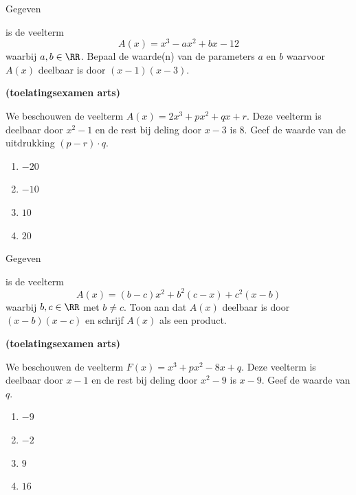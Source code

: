 \documentclass{ximera}
\begin{document}
\begin{Oefening}\setcounter{enumi}{10}
\hypertarget{oef3.10}{Gegeven} is de veelterm
\[
A(x) = x^3 - ax^2 + bx - 12
\]
waarbij $a,b \in \RR$. Bepaal de waarde(n) van de parameters $a$ en $b$ waarvoor $A(x)$ deelbaar is door $(x-1)(x-3)$. 
\end{Oefening}

\begin{Oefening}\setcounter{enumi}{11} 
\hypertarget{oef3.11}{{\bf (toelatingsexamen arts)}}
We beschouwen de veelterm $A(x) = 2x^3 + px^2 + qx + r$. Deze veelterm is deelbaar door $x^2 - 1$ en de rest bij deling door $x-3$ is $8$. Geef de waarde van de uitdrukking $(p-r)\cdot q$.
\begin{multicols}{4} 
\begin{enumerate}

\item 
$-20$
\item 
$-10$
\item 
$10$
\item 
$20$
\end{enumerate}
\end{multicols}
\end{Oefening}

\begin{Oefening}\setcounter{enumi}{12} 
\hypertarget{oef3.12}{Gegeven} is de veelterm
\[
A(x) = (b-c)x^2 + b^2(c-x) + c^2(x-b)
\]
waarbij $b,c \in \RR$ met $b \neq c$. Toon aan dat $A(x)$ deelbaar is door $(x-b)(x-c)$ en schrijf $A(x)$ als een product. 
\end{Oefening}

\begin{Oefening}\setcounter{enumi}{13}  
\hypertarget{oef3.13}{{\bf (toelatingsexamen arts)}}
We beschouwen de veelterm $F(x) = x^3 + px^2 - 8x + q$. Deze veelterm is deelbaar door $x-1$ en de rest bij deling door $x^2-9$ is $x-9$. Geef de waarde van $q$.
\begin{multicols}{4} 
\begin{enumerate}

\item 
$-9$
\item 
$-2$
\item 
$9$
\item 
$16$
\end{enumerate}
\end{multicols}
\end{Oefening}
\end{document}
